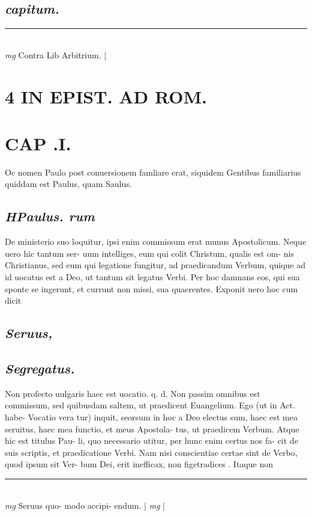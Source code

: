 \documentclass{article}
\begin{document}
\begin{pages}
\subsection*{\textit{capitum.  }}
\vspace{0.5cm}\noindent
\vspace{0.2cm}\rule{1cm}{0.2pt}\\ 
\hspace{0.2cm}\textit{mg}
\footnotesize Contra Lib Arbitrium. 
\normalsize| 
\section*{4 IN EPIST. AD ROM.  }
\marginpar{[ p.]}
\endnumbering\beginnumbering\section{CAP .I.}\pstart Oc nomen Paulo post conuersionem famliare erat, siquidem Gentibus familiarius quiddam est Paulus, quam Saulus.   \pend
{}
{}
\subsection*{\textit{\huge\textbf{H}\normalsize Paulus. rum }}\pstart De ministerio suo loquitur, ipsi enim commissum erat munus Apostolicum. Neque uero hic tantum ser- uum intelliges, eum qui colit Christum, qualis est om- nis Christianus, sed eum qui legatione fungitur, ad praedicandum Verbum, quique ad id uocatus est a Deo, ut tantum sit legatus Verbi. Per hoc damnans eos, qui sua sponte se ingerunt, et currunt non missi, sua quaerentes. Exponit uero hoc cum dicit  \pend
{}
{}
\subsection*{\textit{Seruus, }}
{}
\subsection*{\textit{Segregatus. }}\pstart Non profecto uulgaris haec est uocatio. q. d. Non passim omnibus est commissum, sed quibusdam saltem, ut praedicent Euangelium. Ego (ut in Act. habe- Vocatio vera tur) inquit, seorsum in hoc a Deo electus sum, haec est mea seruitus, haec mea functio, et meus Apostola- tus, ut praedicem Verbum. Atque hic est titulus Pau- li, quo necessario utitur, per hunc enim certus nos fa- cit de suis scriptis, et praedicatione Verbi. Nam nisi conscientiae certae sint de Verbo, quod ipsum sit Ver- bum Dei, erit inefficax, non figetradices . Itaque non  \pend
\vspace{0.5cm}\noindent
\vspace{0.2cm}\rule{1cm}{0.2pt}\\ 
\hspace{0.2cm}\textit{mg}
\footnotesize Seruus quo- modo accipi- endum.  
\normalsize| 
\hspace{0.2cm}\textit{mg}
\footnotesize 
\normalsize| 

\end{pages}
\end{document}
